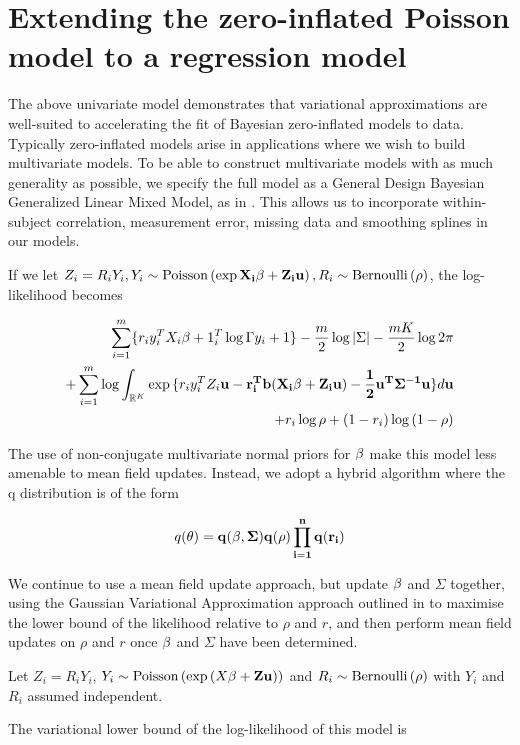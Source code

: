\documentclass{amsart}
\begin{document}
\section{Extending the zero-inflated Poisson model to a regression model}
The above univariate model demonstrates that variational approximations are well-suited
to accelerating the fit of Bayesian zero-inflated models to data. Typically zero-inflated
models arise in applications where we wish to build multivariate models. To be able to
construct multivariate models with as much generality as possible, we specify the full
model as a General Design Bayesian Generalized Linear Mixed Model, as in \cite{zhao06}.
This allows us to incorporate within-subject correlation, measurement error, missing data
and smoothing splines in our models.

If we let $Z_i=R_i Y_i, Y_i \sim \text{Poisson} \left( \exp{\bf X_i\beta + \bf Z_i \bf u} \right), R_i \sim \text{Bernoulli} \left( \rho \right)$,
the log-likelihood becomes

\begin{align*}
\sum_{i=1}^m \{r_i y_i^TX_i \beta + 1_i^T \log{\Gamma{y_i + 1}}\} - \frac{m}{2} \log{|\Sigma|} - \frac{mK}{2} \log{2 \pi} \\
+ \sum_{i=1}^m \log{\int_{\mathbb{R}^K} \exp{\{r_i y_i^T Z_i \bf u- r_i^T b(X_i \bf \beta+ Z_i \bf u) - \frac{1}{2}\bf u^T \Sigma^{-1} \bf u\}} d \bf u} \\
+ r_i \log{\rho} + (1 - r_i) \log{(1 - \rho)}
\end{align*}

The use of non-conjugate multivariate normal priors for $\bf \beta$ make this model less
amenable to mean field updates. Instead, we adopt a hybrid algorithm where the q
distribution is of the form

$$
q(\bf \theta) = q(\bf \beta, \Sigma) q(\rho) \prod_{i=1}^n q(r_i)
$$

We continue to use a mean field update approach, but update $\bf \beta$ and $\Sigma$ together, using
the Gaussian Variational Approximation approach outlined in \cite{ormerod09} to maximise the
lower bound of the likelihood relative to $\rho$ and $r$, and then perform mean field updates on
$\rho$ and $r$ once $\bf \beta$ and $\Sigma$ have been determined.


Let $Z_i = R_i Y_i$, $Y_i \sim \text{Poisson} \left( \exp{\left( X\bf \beta+ Z \bf u\right)} \right)$ and
$R_i \sim \text{Bernoulli} \left( \rho \right)$ with $Y_i$ and $R_i$ assumed independent.

The variational lower bound of the log-likelihood of this model is
\end{document}
